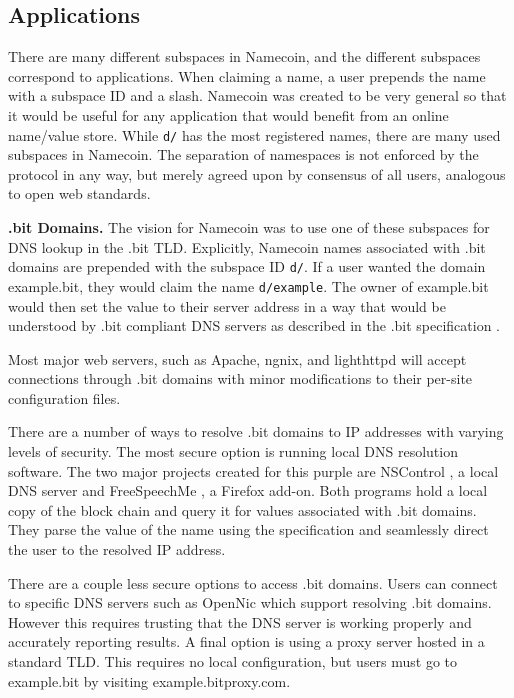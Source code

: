 \subsection{Applications}

There are many different subspaces in Namecoin, and the different subspaces correspond to applications. When claiming a name, a user prepends the name with a subspace ID and a slash. Namecoin was created to be very general so that it would be useful for any application that would benefit from an online name/value store. While {\tt d/} has the most registered names, there are many used subspaces in Namecoin. The separation of namespaces is not enforced by the protocol in any way, but merely agreed upon by consensus of all users, analogous to open web standards.

{\bf .bit Domains.}
The vision for Namecoin was to use one of these subspaces for DNS lookup in the .bit TLD. Explicitly, Namecoin names associated with .bit domains are prepended with the subspace ID {\tt d/}. If a user wanted the domain example.bit, they would claim the name {\tt d/example}. The owner of example.bit would then set the value to their server address in a way that would be understood by .bit compliant DNS servers as described in the .bit specification \cite{bitdnsspec}.

Most major web servers, such as Apache, ngnix, and lighthttpd will accept connections through .bit domains with minor modifications to their per-site configuration files.

There are a number of ways to resolve .bit domains to IP addresses with varying levels of security. The most secure option is running local DNS resolution software. The two major projects created for this purple are NSControl \cite{nmcontrol}, a local DNS server and FreeSpeechMe \cite{freespeechme}, a Firefox add-on. Both programs hold a local copy of the block chain and query it for values associated with .bit domains. They parse the value of the name using the specification and seamlessly direct the user to the resolved IP address.

There are a couple less secure options to access .bit domains. Users can connect to specific DNS servers such as OpenNic \cite{opennic} which support resolving .bit domains. However this requires trusting that the DNS server is working properly and accurately reporting results. A final option is using a proxy server hosted in a standard TLD. This requires no local configuration, but users must go to example.bit by visiting example.bitproxy.com.

